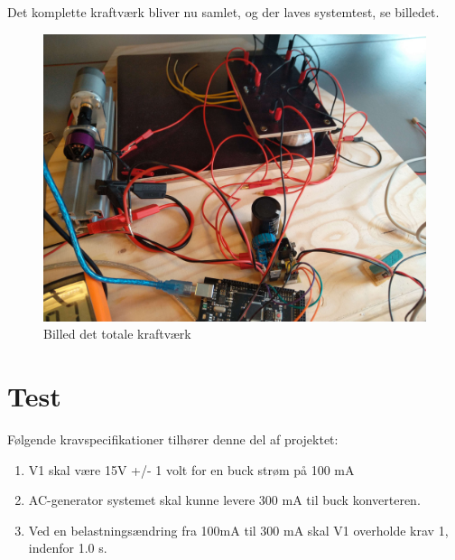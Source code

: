 \documentclass[../main.tex]{subfiles}
\begin{document}
Det komplette kraftværk bliver nu samlet, og der laves systemtest, se billedet.
\begin{figure}[H]
      \includegraphics[width=\textwidth]{Dokumentation/Pictures/kraftverk_total.jpg}
     \caption{Billed det totale kraftværk}
     \label{fig: Kraftverk_total}
\end{figure}

\section{Test}
Følgende kravspecifikationer tilhører denne del af projektet:
\begin{enumerate}
  \item V1 skal være 15V +/- 1 volt for en buck strøm på 100 mA
  \item AC-generator systemet skal kunne levere 300 mA til buck konverteren.
  \item Ved en belastningsændring fra 100mA til 300 mA skal V1 overholde krav 1, indenfor 1.0 s.
\end{enumerate}
\end{document}
